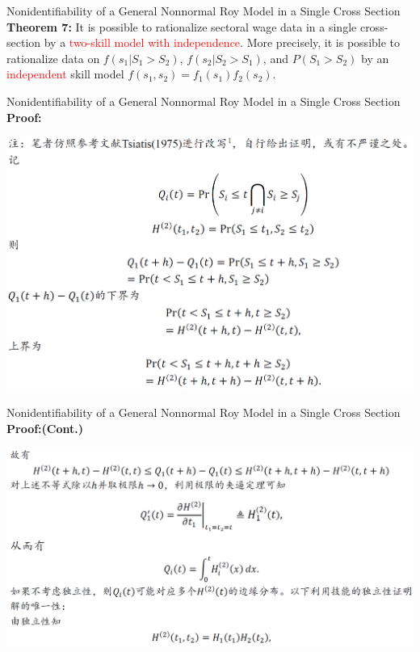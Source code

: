 \documentclass{beamer}
\begin{document}
\begin{frame}{Nonidentifiability of a General Nonnormal Roy Model in a Single Cross Section}
	\textbf{Theorem 7:} It is possible to rationalize sectoral wage data in a single cross-section by a \textcolor{red}{two-skill model with independence}. More precisely, it is possible to rationalize data on $f(s_1|S_1>S_2)$, $f(s_2 |S_2>S_1)$, and $P(S_1>S_2)$ by an \textcolor{red}{independent} skill model $f(s_1,s_2 )=f_1 (s_1) f_2 (s_2)$.
\end{frame}
\begin{frame}{Nonidentifiability of a General Nonnormal Roy Model in a Single Cross Section}
\textbf{Proof:}

\includegraphics[scale=0.5]{theorem7_1}
\end{frame}
\begin{frame}{Nonidentifiability of a General Nonnormal Roy Model in a Single Cross Section}
	\textbf{Proof:(Cont.)}
	
	\includegraphics[scale=0.5]{theorem7_2}
\end{frame}
\end{document}
